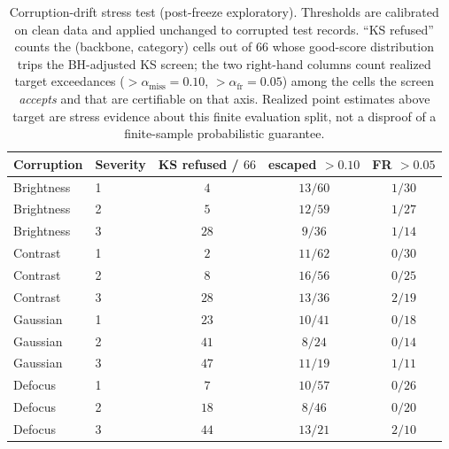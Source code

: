 \documentclass[preprint,11pt]{elsarticle}
\begin{document}
\begin{table}[!htbp]
  \centering
  \small
  \caption{Corruption-drift stress test (post-freeze exploratory). Thresholds are calibrated on
  clean data and applied unchanged to corrupted test records. ``KS refused'' counts the
  (backbone, category) cells out of $66$ whose good-score distribution trips the BH-adjusted
  KS screen; the two right-hand columns count realized target exceedances
  ($>\alpha_{\text{miss}}=0.10$, $>\alpha_{\text{fr}}=0.05$) among the cells the screen
  \emph{accepts} and that are certifiable on that axis. Realized point estimates above target are
  stress evidence about this finite evaluation split, not a disproof of a finite-sample
  probabilistic guarantee.}
  \label{tab:drift}
  \begin{tabular}{@{}llccc@{}}
    \toprule
    Corruption & Severity & KS refused / $66$ & escaped $>0.10$ & FR $>0.05$ \\
    \midrule
    Brightness & 1 & $4$  & $13/60$ & $1/30$ \\
    Brightness & 2 & $5$  & $12/59$ & $1/27$ \\
    Brightness & 3 & $28$ & $9/36$  & $1/14$ \\
    \addlinespace
    Contrast   & 1 & $2$  & $11/62$ & $0/30$ \\
    Contrast   & 2 & $8$  & $16/56$ & $0/25$ \\
    Contrast   & 3 & $28$ & $13/36$ & $2/19$ \\
    \addlinespace
    Gaussian   & 1 & $23$ & $10/41$ & $0/18$ \\
    Gaussian   & 2 & $41$ & $8/24$  & $0/14$ \\
    Gaussian   & 3 & $47$ & $11/19$ & $1/11$ \\
    \addlinespace
    Defocus    & 1 & $7$  & $10/57$ & $0/26$ \\
    Defocus    & 2 & $18$ & $8/46$  & $0/20$ \\
    Defocus    & 3 & $44$ & $13/21$ & $2/10$ \\
    \bottomrule
  \end{tabular}
\end{table}
\end{document}
